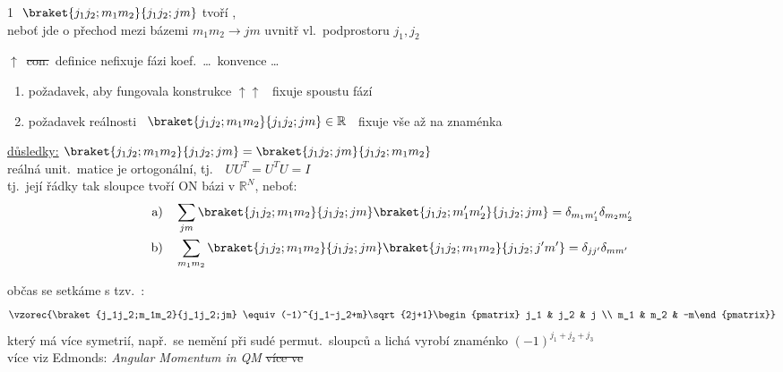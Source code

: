 \begin{minipage}{0.62\textwidth}
\textcircled{1} $\braket{j_1j_2;m_1m_2}{j_1j_2;jm}$ tvoří , \\
\quad neboť jde o přechod mezi bázemi $m_1m_2 \to jm$ uvnitř vl.\ podprostoru $j_1, j_2$
\end{minipage}
\begin{minipage}{0.36\textwidth}
\end{minipage}

\quad $\uparrow$\ \sout{con.}\ definice nefixuje fázi koef.\ \dots\ konvence \dots\ 
\begin{enumerate}[label=\arabic*),nosep]
  \item požadavek, aby fungovala konstrukce $\uparrow\uparrow$ \ fixuje spoustu fází
  \item požadavek reálnosti \ $\braket{j_1j_2;m_1m_2}{j_1j_2;jm}\in\mathbb{R}$ \ fixuje vše až na znaménka
\end{enumerate}

\underline{důsledky:} \quad $\braket{j_1j_2;m_1m_2}{j_1j_2;jm} = \braket{j_1j_2;jm}{j_1j_2;m_1m_2}$ \\
reálná unit.\ matice je ortogonální, tj.\ \ $UU^T = U^TU = I$ \\
tj.\ její řádky tak sloupce tvoří ON bázi v $\mathbb{R}^N$, \quad neboť:
\begin{align*}
  \text{a)}\quad &\sum_{jm}\braket{j_1j_2;m_1m_2}{j_1j_2;jm}\braket{j_1j_2;m_1'm_2'}{j_1j_2;jm} = \delta_{m_1m_1'}\delta_{m_2m_2'} \\
  \text{b)}\quad &\sum_{m_1m_2}\braket{j_1j_2;m_1m_2}{j_1j_2;jm}\braket{j_1j_2;m_1m_2}{j_1j_2;j'm'} = \delta_{jj'}\delta_{mm'}
\end{align*}

občas se setkáme s tzv.\ :
\[
  \vzorec{\braket{j_1j_2;m_1m_2}{j_1j_2;jm} \equiv (-1)^{j_1-j_2+m}\sqrt{2j+1}\begin{pmatrix} j_1 & j_2 & j \\ m_1 & m_2 & -m\end{pmatrix}}
\]
který má více symetrií, např.\ se nemění při sudé permut.\ sloupců a lichá vyrobí znaménko $(-1)^{j_1+j_2+j_3}$ \\
více viz Edmonds: \emph{Angular Momentum in QM} \hfill \sout{více ve}

